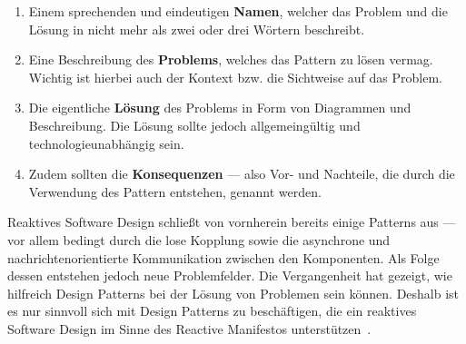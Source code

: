 \begin{enumerate}
\item Einem sprechenden und eindeutigen \textbf{Namen}, welcher das Problem und die Lösung in nicht mehr als zwei oder drei Wörtern beschreibt.
\item Eine Beschreibung des \textbf{Problems}, welches das Pattern zu lösen vermag. Wichtig ist hierbei auch der Kontext bzw. die Sichtweise auf das Problem.
\item Die eigentliche \textbf{Lösung} des Problems in Form von Diagrammen und Beschreibung. Die Lösung sollte jedoch allgemeingültig und technologieunabhängig sein.
\item Zudem sollten die \textbf{Konsequenzen} --- also Vor- und Nachteile, die durch die Verwendung des Pattern entstehen, genannt werden.
\end{enumerate}

Reaktives Software Design schließt von vornherein bereits einige Patterns aus --- vor allem bedingt durch die lose Kopplung sowie die asynchrone und nachrichtenorientierte Kommunikation zwischen den Komponenten. Als Folge dessen entstehen jedoch neue Problemfelder. Die Vergangenheit hat gezeigt, wie hilfreich Design Patterns bei der Lösung von Problemen sein können. Deshalb ist es nur sinnvoll sich mit Design Patterns zu beschäftigen, die ein reaktives Software Design im Sinne des Reactive Manifestos unterstützen~\cite[S.~54]{kuhn_reactive_2015}.